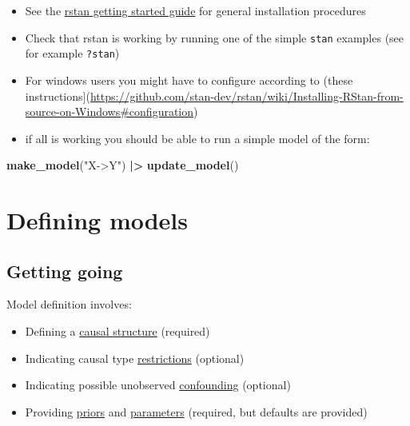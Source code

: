 \documentclass[
  12pt,
]{book}
\newenvironment{Shaded}{\begin{snugshade}}{\end{snugshade}}
\newcommand{\FunctionTok}[1]{\textcolor[rgb]{0.13,0.29,0.53}{\textbf{#1}}}
\newcommand{\NormalTok}[1]{#1}
\newcommand{\SpecialCharTok}[1]{\textcolor[rgb]{0.81,0.36,0.00}{\textbf{#1}}}
\newcommand{\StringTok}[1]{\textcolor[rgb]{0.31,0.60,0.02}{#1}}
\providecommand{\tightlist}{%
  \setlength{\itemsep}{0pt}\setlength{\parskip}{0pt}}
\begin{document}
\begin{itemize}
\tightlist
\item
  See the \href{https://github.com/stan-dev/rstan/wiki/RStan-Getting-Started}{rstan getting started guide} for general installation procedures
\item
  Check that rstan is working by running one of the simple \texttt{stan} examples (see for example \texttt{?stan})
\item
  For windows users you might have to configure according to (these instructions{]}(\url{https://github.com/stan-dev/rstan/wiki/Installing-RStan-from-source-on-Windows\#configuration})
\item
  if all is working you should be able to run a simple model of the form:
\end{itemize}

\begin{Shaded}
\begin{Highlighting}[]
\FunctionTok{make\_model}\NormalTok{(}\StringTok{"X{-}\textgreater{}Y"}\NormalTok{) }\SpecialCharTok{|\textgreater{}} \FunctionTok{update\_model}\NormalTok{()}
\end{Highlighting}
\end{Shaded}

\hypertarget{defining-models}{%
\chapter{Defining models}\label{defining-models}}

\hypertarget{getting-going}{%
\section{Getting going}\label{getting-going}}

Model definition involves:

\begin{itemize}
\tightlist
\item
  Defining a \protect\hyperlink{structure}{causal structure} (required)
\item
  Indicating causal type \protect\hyperlink{restrictions}{restrictions} (optional)
\item
  Indicating possible unobserved \protect\hyperlink{confounding}{confounding} (optional)
\item
  Providing \protect\hyperlink{priors}{priors} and \protect\hyperlink{parameters}{parameters} (required, but defaults are provided)
\end{itemize}
\end{document}
